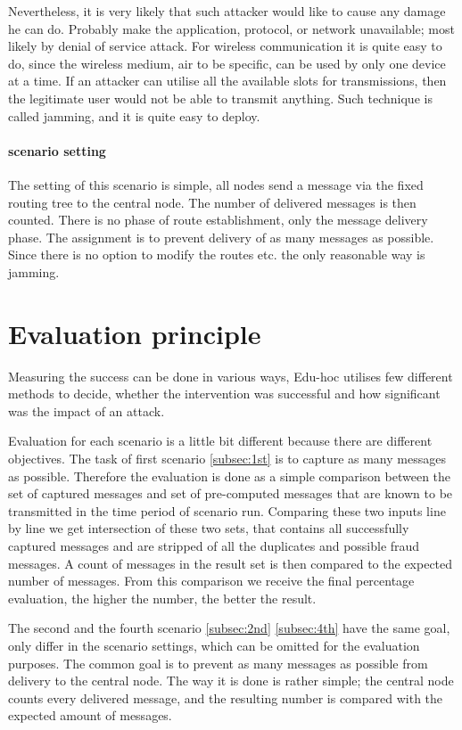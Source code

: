 \documentclass[
  print, %
  Table,   %
  nolof,     %
  nolot,     %
           oneside
]{fithesis3}
\begin{document}
    Nevertheless, it is very likely that such attacker would like to cause any damage he can do. Probably make the application, protocol, or network unavailable; most likely by denial of service attack. For wireless communication it is quite easy to do, since the wireless medium, air to be specific, can be used by only one device at a time. If an attacker can utilise all the available slots for transmissions, then the legitimate user would not be able to transmit anything. Such technique is called jamming, and it is quite easy to deploy.

    \paragraph{scenario setting}
    The setting of this scenario is simple, all nodes send a message via the fixed routing tree to the central node. The number of delivered messages is then counted. There is no phase of route establishment, only the message delivery phase. The assignment is to prevent delivery of as many messages as possible. Since there is no option to modify the routes etc. the only reasonable way is jamming.


  \section{Evaluation principle}\label{sec:eval}
  Measuring the success can be done in various ways, Edu-hoc utilises few different methods to decide, whether the intervention was successful and how significant was the impact of an attack.

  Evaluation for each scenario is a little bit different because there are different objectives. The task of first scenario \ref{subsec:1st} is to capture as many messages as possible. Therefore the evaluation is done as a simple comparison between the set of captured messages and set of pre-computed messages that are known to be transmitted in the time period of scenario run. Comparing these two inputs line by line we get intersection of these two sets, that contains all successfully captured messages and are stripped of all the duplicates and possible fraud messages. A count of messages in the result set is then compared to the expected number of messages. From this comparison we receive the final percentage evaluation, the higher the number, the better the result.

  The second and the fourth scenario \ref{subsec:2nd} \ref{subsec:4th} have the same goal, only differ in the scenario settings, which can be omitted for the evaluation purposes. The common goal is to prevent as many messages as possible from delivery to the central node. The way it is done is rather simple; the central node counts every delivered message, and the resulting number is compared with the expected amount of messages.
\end{document}
